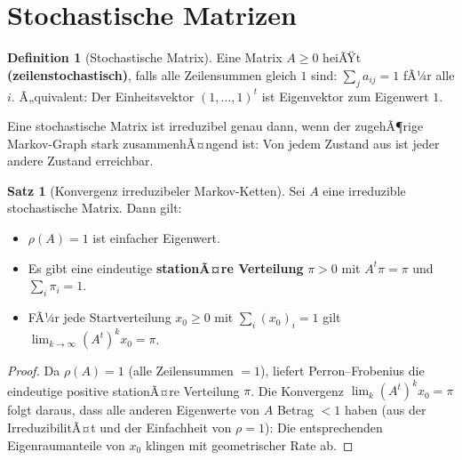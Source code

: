﻿\documentclass[a4paper,12pt]{report}
\theoremstyle{definition}
\newtheorem{definition}{Definition}
\newtheorem{satz}{Satz}
\begin{document}
\section{Stochastische Matrizen}

\begin{definition}[Stochastische Matrix]
    Eine Matrix $A \geq 0$ heiÃŸt \textbf{(zeilenstochastisch)}, falls
    alle Zeilensummen gleich $1$ sind: $\sum_j a_{ij} = 1$ fÃ¼r alle $i$.
    Ã„quivalent: Der Einheitsvektor $(1, \ldots, 1)^t$ ist Eigenvektor
    zum Eigenwert $1$.

    Eine stochastische Matrix ist irreduzibel genau dann, wenn der zugehÃ¶rige
    Markov-Graph stark zusammenhÃ¤ngend ist: Von jedem Zustand aus
    ist jeder andere Zustand erreichbar.
\end{definition}

\begin{satz}[Konvergenz irreduzibeler Markov-Ketten]
    Sei $A$ eine irreduzible stochastische Matrix. Dann gilt:
    \begin{itemize}
        \item[-] $\rho(A) = 1$ ist einfacher Eigenwert.
        \item[-] Es gibt eine eindeutige \textbf{stationÃ¤re Verteilung}
              $\pi > 0$ mit $A^t \pi = \pi$ und $\sum_i \pi_i = 1$.
        \item[-] FÃ¼r jede Startverteilung $x_0 \geq 0$ mit $\sum_i (x_0)_i = 1$
              gilt $\lim_{k \to \infty} (A^t)^k x_0 = \pi$.
    \end{itemize}
\end{satz}
\begin{proof}
    Da $\rho(A) = 1$ (alle Zeilensummen $=1$), liefert Perron--Frobenius
    die eindeutige positive stationÃ¤re Verteilung $\pi$.
    Die Konvergenz $\lim_k (A^t)^k x_0 = \pi$ folgt daraus, dass alle anderen
    Eigenwerte von $A$ Betrag $< 1$ haben (aus der IrreduzibilitÃ¤t und der
    Einfachheit von $\rho = 1$): Die entsprechenden Eigenraumanteile von
    $x_0$ klingen mit geometrischer Rate ab.
\end{proof}
\end{document}
